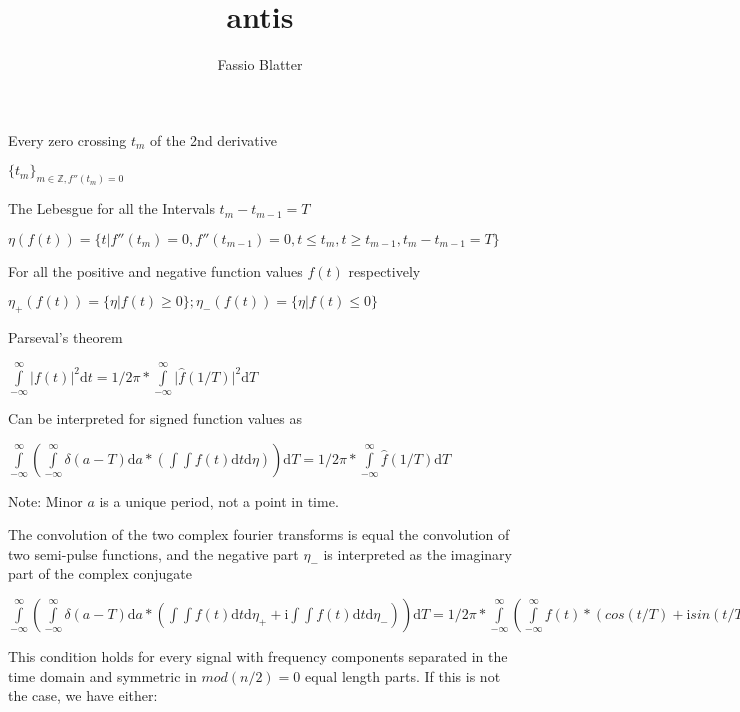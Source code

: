 \documentclass{article}
\renewcommand{\baselinestretch}{2}
\begin{document}
\title{antis}
\author{Fassio Blatter}

\maketitle


\renewcommand{\baselinestretch}{2}

Every zero crossing $t_{m}$ of the 2nd derivative

$\{t_{m}\}_{m \in \mathbb{Z} , f''(t_{m})=0}$

The Lebesgue for all the Intervals $t_{m}-t_{m-1}=T$

$\eta(f(t))=\{t \vert f''(t_{m})=0, f''(t_{m-1})=0, t \le t_{m}, t \ge t_{m-1}, t_{m} - t_{m-1}=T \}$

For all the positive and negative function values $f(t)$ respectively

$\eta_{+}(f(t))=\{{\eta \vert f(t) \ge 0}\}; \eta_{-}(f(t))=\{{\eta \vert f(t) \le 0}\}$

Parseval's theorem

$\int\limits_{-\infty}^{\infty} \vert f(t) \vert ^2 \mathrm{d} t = 1/2\pi * \int\limits_{-\infty}^{\infty} \vert \hat{f}(1/T) \vert ^2  \mathrm{d} T$

Can be interpreted for signed function values as

$\int\limits_{-\infty}^{\infty} (\int\limits_{-\infty}^{\infty} \delta (a - T) \mathrm{d} a * (\int\int f(t) \mathrm{d} t \mathrm{d} \eta) )\mathrm{d} T = 1/2\pi * \int\limits_{-\infty}^{\infty} \hat{f}(1/T) \mathrm{d} T$

Note: Minor $a$ is a unique period, not a point in time.

The convolution of the two complex fourier transforms is equal the convolution of two semi-pulse functions, and the negative part $\eta_{-}$ is interpreted as the imaginary part of the complex conjugate

$\int\limits_{-\infty}^{\infty}(\int\limits_{-\infty}^{\infty} \delta (a - T) \mathrm{d} a * (\int \int f(t) \mathrm{d} t \mathrm{d} \eta_{+} + \mathrm{i} \int \int f(t) \mathrm{d} t \mathrm{d} \eta_{-}))  \mathrm{d} T = 1/2\pi * \int\limits_{-\infty}^{\infty} ( \int\limits_{-\infty}^{\infty}  f(t) * (cos(t/T)+\mathrm{i} sin(t/T)) \mathrm{d} t ) \mathrm{d} T$

\renewcommand{\baselinestretch}{1}

This condition holds for every signal with frequency components separated in the time domain and symmetric in $mod(n/2)=0$ equal length parts. If this is not the case, we have either:
\end{document}
